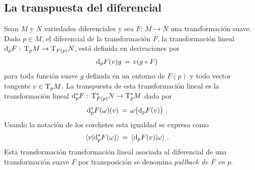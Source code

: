 \subsection{La transpuesta del diferencial}
Sean $M$ y $N$ variedades diferenciales y sea $F:\,M\rightarrow N$ una
transformaci\'{o}n suave. Dado $p\in M$, el diferencial de la
transformaci\'{o}n $F$, la transformaci\'{o}n lineal
$\diferencial[p]{F}:\,\tangente[p]{M}\rightarrow\tangente[F(p)]{N}$, est\'{a}
definida en derivaciones por
\begin{align*}
	\diferencial[p]{F}(v)g & \,=\,v(g\circ F)
\end{align*}
%
para toda funci\'{o}n suave $g$ definida en un entorno de $F(p)$ y todo
vector tangente $v\in\tangente[p]{M}$. La transpuesta de esta
transformaci\'{o}n lineal es la transformaci\'{o}n lineal
$\diferencial*[p]{F}:\,\tangente*[F(p)]{N}\rightarrow\tangente*[p]{M}$
dada por
\begin{align*}
	\diferencial*[p]{F}(\omega)(v) & \,=\,
		\omega\big(\diferencial[p]{F}(v)\big)
	\text{ .}
\end{align*}
%
Usando la notaci\'{o}n de los corchetes esta igualdad se expresa como
\begin{align*}
	\langle v|\diferencial*[p]{F}(\omega)\rangle & \,=\,
		\langle \diferencial[p]{F}(v)|\omega\rangle
	\text{ .}
\end{align*}
%
Esta transformaci\'{o}n transformaci\'{o}n lineal asociada al diferencial
de una transformaci\'{o}n suave $F$ por transposici\'{o}n se denomina
\emph{pullback de $F$ en $p$}.

